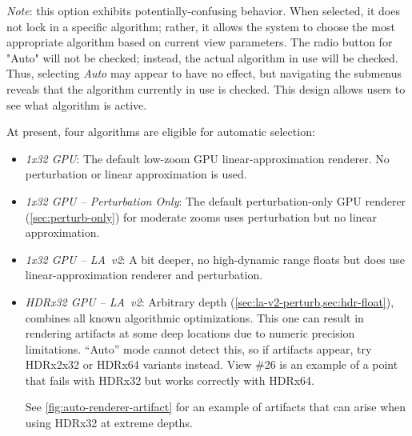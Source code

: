 \begin{itemize}
\begin{itemize}
      \emph{Note}: this option exhibits potentially-confusing behavior.  When
      selected, it does not lock in a specific algorithm; rather, it allows the
      system to choose the most appropriate algorithm based on current view
      parameters. The radio button for "Auto" will not be checked; instead, the
      actual algorithm in use will be checked.  Thus, selecting \emph{Auto} may
      appear to have no effect, but navigating the submenus reveals that the
      algorithm currently in use is checked.  This design allows users to see
      what algorithm is active.

      At present, four algorithms are eligible for automatic selection:
      \begin{itemize}
        \item \emph{1x32 GPU}: The default low-zoom GPU linear-approximation
              renderer.  No perturbation or linear approximation is used.
        \item \emph{1x32 GPU -- Perturbation Only}: The default
              perturbation-only GPU renderer (\cref{sec:perturb-only}) for
              moderate zooms uses perturbation but no linear approximation.
        \item \emph{1x32 GPU -- LA~v2}: A bit deeper, no high-dynamic range
              floats but does use linear-approximation renderer and
              perturbation.
        \item \emph{HDRx32 GPU -- LA~v2}: Arbitrary depth (\cref{sec:la-v2-perturb,sec:hdr-float}), combines all known
              algorithmic optimizations.  This one can result in rendering
              artifacts at some deep locations due to numeric precision
              limitations.  ``Auto'' mode cannot detect this, so if artifacts appear, try
              HDRx2x32 or HDRx64 variants instead.  View \#26 is an example of a
              point that fails with HDRx32 but works correctly with HDRx64.

              See \cref{fig:auto-renderer-artifact} for an example of
              artifacts that can arise when using HDRx32 at extreme depths.
      \end{itemize}


\end{itemize}
\end{itemize}
